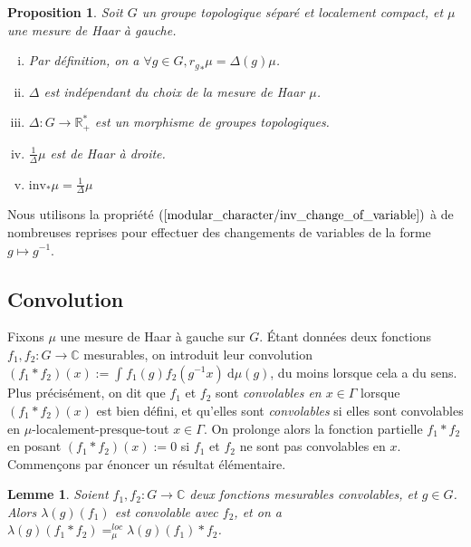 \documentclass[a4paper,12pt]{article}
\newtheorem{proposition}[theorem]{Proposition}
\newtheorem{lemma}[theorem]{Lemme}
\newcommand{\R}{\mathbb{R}}
\newcommand{\C}{\mathbb{C}}
\newcommand{\integral}[4]{\int_{#1}^{#2} #3~\mathrm{d}#4}
\newcommand{\inv}{^{-1}}
\newcommand{\invop}{\mathrm{inv}}
\begin{document}
\begin{proposition}\label{modular_character}
    Soit $G$ un groupe topologique séparé et localement compact, et $\mu$ une mesure de Haar à gauche.
    \begin{enumerate}[(i)]
        \item\label{modular_character/def} Par définition, on a $\forall g\in G, {r_g}_*\mu = \Delta(g)\mu$.
        \item\label{modular_character/indep} $\Delta$ est indépendant du choix de la mesure de Haar $\mu$.
        \item\label{modular_character/continuous_group_hom} $\Delta:G\to\R_+^*$ est un morphisme de groupes topologiques.
        \item\label{modular_character/right_haar} $\frac{1}{\Delta}\mu$ est de Haar à droite.
        \item\label{modular_character/inv_change_of_variable} $\invop_*\mu = \frac{1}{\Delta}\mu$
    \end{enumerate}
\end{proposition}

Nous utilisons la propriété $(\ref{modular_character/inv_change_of_variable})$ à de nombreuses reprises
pour effectuer des changements de variables de la forme $g\mapsto g\inv$. 

\subsection*{Convolution}

Fixons $\mu$ une mesure de Haar à gauche sur $G$. Étant données deux fonctions $f_1, f_2 : G\to\C$ mesurables, 
on introduit leur convolution $(f_1\ast f_2)(x) := \integral{}{}{f_1(g)f_2(g\inv x)}{\mu(g)}$, du moins lorsque cela a du sens.
Plus précisément, on dit que $f_1$ et $f_2$ sont \emph{convolables en $x\in\Gamma$} lorsque $(f_1\ast f_2)(x)$ est bien défini,
et qu'elles sont \emph{convolables} si elles sont convolables en $\mu$-localement-presque-tout $x\in\Gamma$.
On prolonge alors la fonction partielle $f_1\ast f_2$ en posant $(f_1\ast f_2)(x) := 0$ si $f_1$ et $f_2$
ne sont pas convolables en $x$. Commençons par énoncer un résultat élémentaire.

\begin{lemma}\label{translate_conv}
    Soient $f_1, f_2 : G\to\C$ deux fonctions mesurables convolables, et $g\in G$. Alors $\lambda(g)(f_1)$ est
    convolable avec $f_2$, et on a $\lambda(g)(f_1\ast f_2) =_{\mu}^{loc} \lambda(g)(f_1)\ast f_2$.
\end{lemma}
\end{document}
